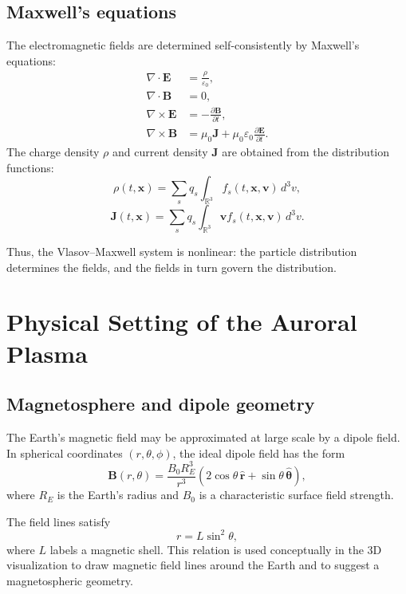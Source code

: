 \documentclass[11pt]{article}
\begin{document}
\subsection{Maxwell's equations}
The electromagnetic fields are determined self-consistently by Maxwell's equations:
\begin{align}
\nabla \cdot \bm{E} &= \frac{\rho}{\varepsilon_0}, \\
\nabla \cdot \bm{B} &= 0, \\
\nabla \times \bm{E} &= -\frac{\partial \bm{B}}{\partial t}, \\
\nabla \times \bm{B} &= \mu_0 \bm{J} + \mu_0 \varepsilon_0 \frac{\partial \bm{E}}{\partial t}.
\end{align}
The charge density \(\rho\) and current density \(\bm{J}\) are obtained from the distribution functions:
\begin{equation}
\rho(t,\bm{x}) = \sum_s q_s \int_{\mathbb{R}^3} f_s(t,\bm{x},\bm{v})\,d^3v,
\end{equation}
\begin{equation}
\bm{J}(t,\bm{x}) = \sum_s q_s \int_{\mathbb{R}^3} \bm{v} f_s(t,\bm{x},\bm{v})\,d^3v.
\end{equation}

Thus, the Vlasov--Maxwell system is nonlinear: the particle distribution determines the fields, and the fields in turn govern the distribution.

\section{Physical Setting of the Auroral Plasma}

\subsection{Magnetosphere and dipole geometry}
The Earth's magnetic field may be approximated at large scale by a dipole field. In spherical coordinates \((r,\theta,\phi)\), the ideal dipole field has the form
\begin{equation}
\bm{B}(r,\theta)
=
\frac{B_0 R_E^3}{r^3}
\left(
2\cos\theta\,\hat{\bm{r}} + \sin\theta\,\hat{\bm{\theta}}
\right),
\end{equation}
where \(R_E\) is the Earth's radius and \(B_0\) is a characteristic surface field strength.

The field lines satisfy
\begin{equation}
r = L \sin^2\theta,
\label{eq:dipoleline}
\end{equation}
where \(L\) labels a magnetic shell. This relation is used conceptually in the 3D visualization to draw magnetic field lines around the Earth and to suggest a magnetospheric geometry.
\end{document}
